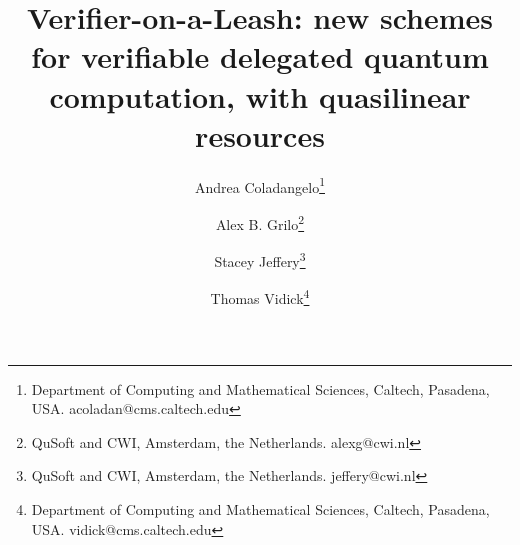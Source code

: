 \documentclass[11pt]{article}
\begin{document}
\title{Verifier-on-a-Leash: new schemes for verifiable delegated quantum computation, with quasilinear resources}

\author{Andrea Coladangelo\thanks{Department of Computing and Mathematical Sciences, Caltech, Pasadena, USA. acoladan@cms.caltech.edu}
  \and Alex B. Grilo\thanks{QuSoft and CWI, Amsterdam, the Netherlands. alexg@cwi.nl}
  \and Stacey Jeffery\thanks{QuSoft and CWI, Amsterdam, the Netherlands. jeffery@cwi.nl} %
  \and Thomas Vidick\thanks{Department of Computing and Mathematical Sciences, Caltech, Pasadena, USA. vidick@cms.caltech.edu}}%


\date{}
\maketitle
\end{document}
